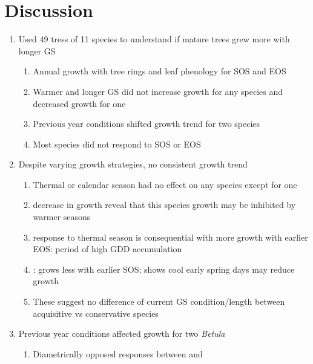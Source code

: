 \section*{Discussion}
\begin{enumerate}
\item Used 49 tress of 11 species to understand if mature trees grew more with longer GS
  \begin{enumerate}
  \item Annual growth with tree rings and leaf phenology for SOS and EOS
  
  \item Warmer and longer GS did not increase growth for any species and decreased growth for one
  
  \item Previous year conditions shifted growth trend for two species
  
  \item Most species did not respond to SOS or EOS
  
  \end{enumerate}

\item Despite varying growth strategies, no consistent growth trend
  \begin{enumerate}
  \item Thermal or calendar season had no effect on any species except for one
  
  \item {\Ball} decrease in growth reveal that this species growth may be inhibited by warmer seasons
  
  \item {\Ball} response to thermal season is consequential with more growth with earlier EOS: period of high GDD accumulation
  
  \item {\Tame}: grows less with earlier SOS; shows cool early spring days may reduce growth
  
  \item These suggest no difference of current GS condition/length between acquisitive vs conservative species 
  
  \end{enumerate}

\item Previous year conditions affected growth for two \textit{Betula}
  \begin{enumerate}
  \item Diametrically opposed responses between {\Ball} and {\Bnig}
  

\end{enumerate}
\end{enumerate}
